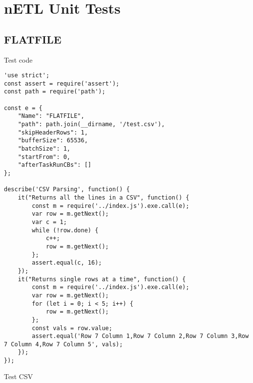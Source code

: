 \section{nETL Unit Tests}

\subsection{FLATFILE}
Test code
\label{FLATFILE-tests}
\begin{verbatim}
'use strict';
const assert = require('assert');
const path = require('path');

const e = {
    "Name": "FLATFILE",
    "path": path.join(__dirname, '/test.csv'),
    "skipHeaderRows": 1,
    "bufferSize": 65536,
    "batchSize": 1,
    "startFrom": 0,
    "afterTaskRunCBs": []
};

describe('CSV Parsing', function() {
    it("Returns all the lines in a CSV", function() {
        const m = require('../index.js').exe.call(e);
        var row = m.getNext();
        var c = 1;
        while (!row.done) {
            c++;
            row = m.getNext();
        };
        assert.equal(c, 16);
    });
    it("Returns single rows at a time", function() {
        const m = require('../index.js').exe.call(e);
        var row = m.getNext();
        for (let i = 0; i < 5; i++) {
            row = m.getNext();
        };
        const vals = row.value;
        assert.equal('Row 7 Column 1,Row 7 Column 2,Row 7 Column 3,Row 7 Column 4,Row 7 Column 5', vals);
    });
});
\end{verbatim}

Test CSV
\label{FLATFILE-CSV}

